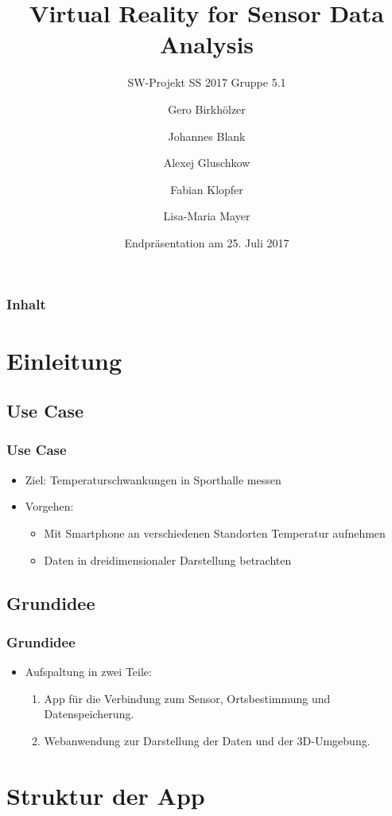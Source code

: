 \documentclass{beamer}
\title{Virtual Reality for Sensor Data Analysis}
\subtitle{SW-Projekt SS 2017 Gruppe 5.1}
\author{Gero Birkhölzer \and Johannes Blank \and Alexej Gluschkow \\ \and Fabian Klopfer \and Lisa-Maria Mayer}
\date{Endpräsentation am 25. Juli 2017}
\begin{document}
\frame{\titlepage}



\begin{frame}
  \frametitle{Inhalt}
  \tableofcontents%
\end{frame}


\section{Einleitung}

\subsection{Use Case}

\begin{frame}
\frametitle{Use Case}
\begin{itemize}
	\item Ziel: Temperaturschwankungen in Sporthalle messen
	\item Vorgehen: \begin{itemize}
		\item Mit Smartphone an verschiedenen Standorten Temperatur aufnehmen
		\item Daten in dreidimensionaler Darstellung betrachten
	\end{itemize}
		
\end{itemize}
\end{frame}


\subsection{Grundidee} %

\begin{frame}
\frametitle{Grundidee}
\begin{itemize}
	\item Aufspaltung in zwei Teile: \pause
  \begin{enumerate}
    \item App für die Verbindung zum Sensor, Ortsbestimmung und Datenspeicherung.
    \item Webanwendung zur Darstellung der Daten und der 3D-Umgebung.
  \end{enumerate}
\end{itemize}
\end{frame}


\section{Struktur der App}
\end{document}
